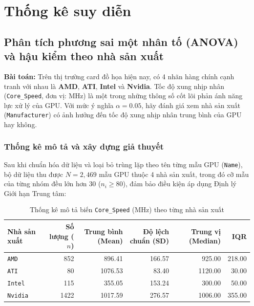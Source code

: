 \section{Thống kê suy diễn}
    \subsection{Phân tích phương sai một nhân tố (ANOVA) và hậu kiểm theo nhà sản xuất}
    \textbf{Bài toán:} Trên thị trường card đồ họa hiện nay, có 4 nhãn hàng chính cạnh tranh với nhau là \textbf{AMD}, \textbf{ATI}, \textbf{Intel} và \textbf{Nvidia}. Tốc độ xung nhịp nhân (\texttt{Core\_Speed}, đơn vị: MHz) là một trong những thông số cốt lõi phản ánh năng lực xử lý của GPU. Với mức ý nghĩa $\alpha = 0.05$, hãy đánh giá xem nhà sản xuất (\texttt{Manufacturer}) có ảnh hưởng đến tốc độ xung nhịp nhân trung bình của GPU hay không.

    \subsubsection{Thống kê mô tả và xây dựng giả thuyết}
        Sau khi chuẩn hóa dữ liệu và loại bỏ trùng lặp theo tên từng mẫu GPU (\texttt{Name}), bộ dữ liệu thu được $N = 2,469$ mẫu GPU thuộc 4 nhà sản xuất, trong đó cỡ mẫu của từng nhóm đều lớn hơn $30$ ($n_i \ge 80$), đảm bảo điều kiện áp dụng Định lý Giới hạn Trung tâm:

        \begin{table}[H]
            \centering
            \renewcommand{\arraystretch}{1.3}
            \begin{tabular}{|l|r|r|r|r|r|}
                \hline
                \textbf{Nhà sản xuất} & \textbf{Số lượng ($n$)} & \textbf{Trung bình (Mean)} & \textbf{Độ lệch chuẩn (SD)} & \textbf{Trung vị (Median)} & \textbf{IQR} \\
                \hline
                \texttt{AMD} & 852 & 896.41 & 166.57 & 925.00 & 218.00 \\
                \hline
                \texttt{ATI} & 80 & 1076.53 & 83.40 & 1120.00 & 30.00 \\
                \hline
                \texttt{Intel} & 115 & 355.05 & 153.24 & 300.00 & 50.00 \\
                \hline
                \texttt{Nvidia} & 1422 & 1017.59 & 276.57 & 1006.00 & 355.00 \\
                \hline
            \end{tabular}
            \caption{Thống kê mô tả biến \texttt{Core\_Speed} (MHz) theo từng nhà sản xuất}
            \label{tab:anova_desc}
        \end{table}

